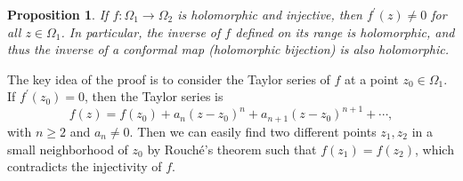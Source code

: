 \documentclass{article}
\newtheorem{proposition}[theorem]{Proposition}
\theoremstyle{definition}
\renewcommand{\geq}{\geqslant}
\begin{document}
\begin{proposition}\label{inj hol}
    If $f\colon \Omega_1\to \Omega_2$ is holomorphic and injective, then $f^{\prime}(z)\neq 0$ for all $z\in \Omega_1$. In particular, the inverse of $f$ defined on its range is holomorphic, and thus the inverse of a conformal map (holomorphic bijection) is also holomorphic.
\end{proposition}
The key idea of the proof is to consider the Taylor series of $f$ at a point $z_0\in \Omega_1$. If $f^{\prime}(z_0)=0$, then the Taylor series is
\begin{equation*}
    f(z) = f(z_0) + a_n (z-z_0)^n + a_{n+1} (z-z_0)^{n+1} + \cdots,
\end{equation*}
with $n\geq 2$ and $a_n\neq 0$. Then we can easily find two different points $z_1,z_2$ in a small neighborhood of $z_0$ by Rouché's theorem such that $f(z_1)=f(z_2)$, which contradicts the injectivity of $f$. 
\end{document}
